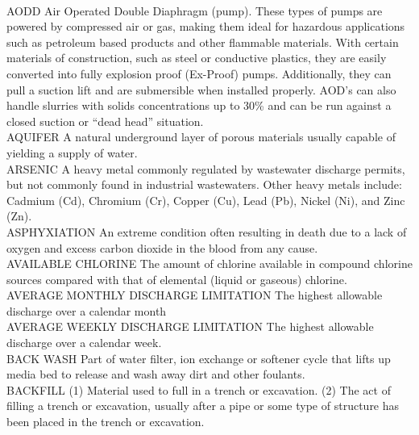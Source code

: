\documentclass{article}
\begin{document}
\vspace{0.3cm}\\
AODD
Air Operated Double Diaphragm (pump). These types of pumps are powered by compressed air or gas, making them ideal for hazardous applications such as petroleum based products and other flammable materials. With certain materials of construction, such as steel or conductive plastics, they are easily converted into fully explosion proof (Ex-Proof) pumps. Additionally, they can pull a suction lift and are submersible when installed properly. AOD’s can also handle slurries with solids concentrations up to 30\% and can be run against a closed suction or “dead head” situation.
\vspace{0.3cm}\\
AQUIFER
A natural underground layer of porous materials usually capable of yielding a supply of water.
\vspace{0.3cm}\\
ARSENIC
A heavy metal commonly regulated by wastewater discharge permits, but not commonly found in industrial wastewaters. Other heavy metals include: Cadmium (Cd), Chromium (Cr), Copper (Cu), Lead (Pb), Nickel (Ni), and Zinc (Zn).
\vspace{0.3cm}\\
ASPHYXIATION
An extreme condition often resulting in death due to a lack of oxygen and excess carbon dioxide in the blood from any cause. 
\vspace{0.3cm}\\
AVAILABLE CHLORINE
The amount of chlorine available in compound chlorine sources compared with that of elemental (liquid or gaseous) chlorine.
\vspace{0.3cm}\\
AVERAGE MONTHLY DISCHARGE LIMITATION
The highest allowable discharge over a calendar month 
\vspace{0.3cm}\\
AVERAGE WEEKLY DISCHARGE LIMITATION
The highest allowable discharge over a calendar week. 
\vspace{0.3cm}\\
BACK WASH
Part of water filter, ion exchange or softener cycle that lifts up media bed to release and wash away dirt and other foulants.
\vspace{0.3cm}\\
BACKFILL
(1) Material used to full in a trench or excavation. (2) The act of filling a trench or excavation, usually after a pipe or some type of structure has been placed in the trench or excavation. 
\vspace{0.3cm}\\
\end{document}
